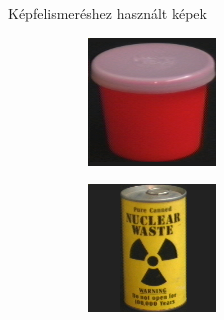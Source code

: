 \documentclass{beamer}
\begin{document}
\begin{frame}{Képfelismeréshez használt képek}
\begin{figure}
\begin{subfigure}{55pt}
        \end{subfigure}
        \begin{subfigure}{55pt}
            \centering
        \includegraphics[width=\textwidth]{figures/coil_original/95.png}
        
        \end{subfigure}
        \begin{subfigure}{55pt}
            \centering
        \includegraphics[width=\textwidth]{figures/coil_original/99.png}
        
        \end{subfigure}
    \end{figure}
\end{frame}
\end{document}
